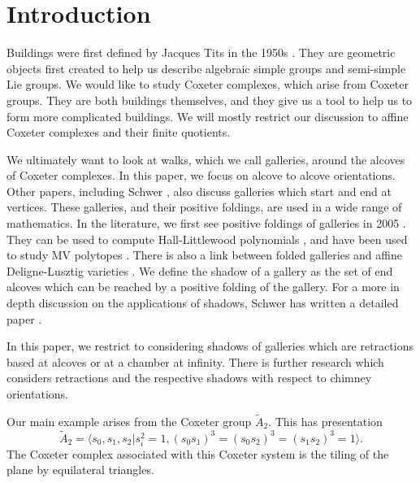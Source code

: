 \documentclass[11pt]{article}
\begin{document}
\section{Introduction}
Buildings were first defined by Jacques Tits in the 1950s \cite{TITS}. They are geometric objects first created to help us describe algebraic simple groups and semi-simple Lie groups. We would like to study Coxeter complexes, which arise from Coxeter groups. They are both buildings themselves, and they give us a tool to help us to form more complicated buildings. We will mostly restrict our discussion to affine Coxeter complexes and their finite quotients.

We ultimately want to look at walks, which we call galleries, around the alcoves of Coxeter complexes. In this paper, we focus on alcove to alcove orientations. Other papers, including Schwer \cite{WILD}, also discuss galleries which start and end at vertices. These galleries, and their positive foldings, are used in a wide range of mathematics. In the literature, we first see positive foldings of galleries in 2005 \cite{LSGAL}. They can be used to compute Hall-Littlewood polynomials \cite{HL}, and have been used to study MV polytopes \cite{MVPOLY}. There is also a link between folded galleries and affine Deligne-Lusztig varieties \cite{DEL}. We define the shadow of a gallery as the set of end alcoves which can be reached by a positive folding of the gallery. For a more in depth discussion on the applications of shadows, Schwer has written a detailed paper \cite{WILD}.

In this paper, we restrict to considering shadows of galleries which are retractions based at alcoves or at a chamber at infinity. There is further research \cite{NAQVI} which considers retractions and the respective shadows with respect to chimney orientations.

 

Our main example arises from the Coxeter group $\tilde{A}_2$. This has presentation
\[\tilde{A}_2=\langle s_0,s_1,s_2|s_i^2=1, (s_0s_1)^3=(s_0s_2)^3=(s_1s_2)^3=1\rangle.\]
The Coxeter complex associated with this Coxeter system is the tiling of the plane by equilateral triangles. 
\end{document}
